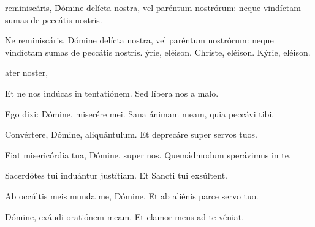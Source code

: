 \documentclass[fontsize=9pt,paper=A6,twoside,BCOR=1mm,DIV=22,headinclude]{scrarticle}
\begin{document}


\vspace{3em}



\vspace{-2.4em}

\begin{multicols}{2}

{


 reminiscáris, \f Dómine delícta nostra, vel paréntum nostrórum: neque vindíctam sumas de peccátis nostris. \TPA 






}

{







\A Ne reminiscáris, Dómine delícta nostra, vel paréntum nostrórum: neque vindíctam sumas de peccátis nostris. \TPA 
{}ýrie, eléison. Christe, eléison. Kýrie, eléison.

ater noster, 

\V Et ne nos indúcas in tentatiónem. \R Sed líbera nos a malo.

\V Ego dixi: Dómine, miserére mei. \R Sana ánimam meam, quia peccávi tibi.

\V Convértere, Dómine, aliquántulum. \R Et deprecáre super servos tuos.

\V Fiat misericórdia tua, Dómine, super nos. \R Quemádmodum sperávimus in te.

\V Sacerdótes tui induántur justítiam. \R Et Sancti tui exsúltent.

\V Ab occúltis meis munda me, Dómine. \R Et ab aliénis parce servo tuo.

\V Dómine, exáudi oratiónem meam. \R Et clamor meus ad te véniat. 

}
\end{multicols}
\end{document}
